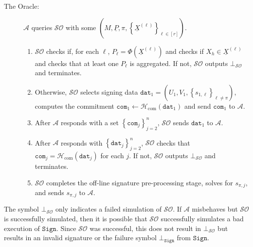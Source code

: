 \documentclass{mrl}
\theoremstyle{definition}
\numberwithin{theorem}{subsection}
\newcommand{\adversary}{\mathcal{A}}
\begin{document}
\begin{description}
\item [The Oracle:] $\adversary$ queries $\mathcal{SO}$ with some $\left(M, \underline{P}, \pi, \left\{\underline{X}^{(\ell)}\right\}_{\ell \in [r]}\right)$.

\begin{enumerate}
\item $\mathcal{SO}$ checks if, for each $\ell$, $P_\ell = \Phi(\underline{X}^{(\ell)})$ and checks if $X_h \in \underline{X}^{(\ell)}$ and checks that at least one $P_\ell$ is aggregated. If not, $\mathcal{SO}$ outputs $\bot_{\mathcal{SO}}$ and terminates.


\item \label{dat1} Otherwise, $\mathcal{SO}$ selects signing data $\texttt{dat}_1 = (U_1, V_1, \left\{s_{1, \ell}\right\}_{\ell \neq \pi})$, computes the commitment $\texttt{com}_1 \leftarrow \mathcal{H}_{\text{com}}(\texttt{dat}_1)$ and send  $\texttt{com}_1$ to $\adversary$. %

\item After $\adversary$ responds with a set $\left\{\texttt{com}_j\right\}_{j = 2}^{n}$, $\mathcal{SO}$ sends $\texttt{dat}_{1}$ to $\adversary$. 

\item After $\adversary$ responds with $\left\{\texttt{dat}_{j}\right\}_{j=2}^{n}$, $\mathcal{SO}$ checks that $\texttt{com}_j = \mathcal{H}_{\text{com}}(\texttt{dat}_j)$ for each $j$. If not, $\mathcal{SO}$ outputs $\bot_{\mathcal{SO}}$ and terminates.

\item $\mathcal{SO}$ completes the off-line signature pre-processing stage, solves for $s_{\pi, j}$, and sends $s_{\pi,j}$ to $\adversary$. 

\end{enumerate} 

\end{description}

The symbol $\bot_{\mathcal{SO}}$ only indicates a failed simulation of  $\mathcal{SO}$.  If $\adversary$ misbehaves but $\mathcal{SO}$ is successfully simulated, then it is possible that $\mathcal{SO}$ successfully simulates a bad execution of $\texttt{Sign}$. Since $\mathcal{SO}$ was successful, this does not result in $\bot_{\mathcal{SO}}$ but results in an invalid signature or the failure symbol $\bot_{\texttt{Sign}}$ from $\texttt{Sign}$. 
\end{document}
